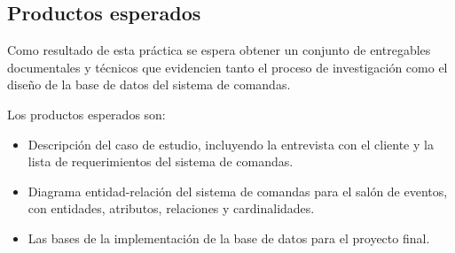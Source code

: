 \subsection{Productos esperados}

Como resultado de esta práctica se espera obtener un conjunto de entregables documentales y técnicos que evidencien tanto el proceso de investigación como el diseño de la base de datos del sistema de comandas.

Los productos esperados son:
\begin{itemize}[noitemsep]
     \item Descripción del caso de estudio, incluyendo la entrevista con el cliente y la lista de requerimientos del sistema de comandas.
    \item Diagrama entidad-relación del sistema de comandas para el salón de eventos, con entidades, atributos, relaciones y cardinalidades.
    \item Las bases de la implementación de la base de datos para el proyecto final.
\end{itemize}
